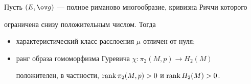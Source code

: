 \begin{thm}


Пусть $(E,\g)$ --- полное риманово многообразие, кривизна Риччи которого


ограничена снизу положительным числом. Тогда


\begin{itemize}


\item[1)] характеристический класс расслоения $\mu$ отличен от нуля$;$


\item[2)] ранг образа гомоморфизма Гуревича $\chi:\pi_{2}(M,p)\to


H_{2}(M)$


положителен, в частности, $\operatorname{rank}\pi_{2}(M,p)>0$ и $\operatorname{rank} H_{2}(M)>0$.


\end{itemize}


\end{thm}





